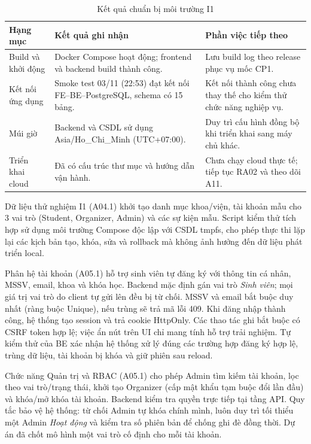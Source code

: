 \begin{table}[H]
\centering\small
\caption{Kết quả chuẩn bị môi trường I1}\label{tab:i1-env}
\begin{tabularx}{\linewidth}{@{}p{.23\linewidth}XX@{}}
\toprule
\textbf{Hạng mục} & \textbf{Kết quả ghi nhận} & \textbf{Phần việc tiếp theo}\\\midrule
Build và khởi động & Docker Compose hoạt động; frontend và backend build thành công. & Lưu build log theo release phục vụ mốc CP1.\\
Kết nối ứng dụng & Smoke test 03/11 (22:53) đạt kết nối FE--BE--PostgreSQL, schema có 15 bảng. & Kết nối thành công chưa thay thế cho kiểm thử chức năng nghiệp vụ.\\
Múi giờ & Backend và CSDL sử dụng Asia/Ho\_Chi\_Minh (UTC+07:00). & Duy trì cấu hình đồng bộ khi triển khai sang máy chủ khác.\\
Triển khai cloud & Đã có cấu trúc thư mục và hướng dẫn vận hành. & Chưa chạy cloud thực tế; tiếp tục RA02 và theo dõi A11.\\
\bottomrule
\end{tabularx}
\end{table}

Dữ liệu thử nghiệm I1 (A04.1) khởi tạo danh mục khoa/viện, tài khoản mẫu cho 3 vai trò (Student, Organizer, Admin) và các sự kiện mẫu. Script kiểm thử tích hợp sử dụng môi trường Compose độc lập với CSDL tmpfs, cho phép thực thi lặp lại các kịch bản tạo, khóa, sửa và rollback mà không ảnh hưởng đến dữ liệu phát triển local.


Phân hệ tài khoản (A05.1) hỗ trợ sinh viên tự đăng ký với thông tin cá nhân, MSSV, email, khoa và khóa học. Backend mặc định gán vai trò \textit{Sinh viên}; mọi giá trị vai trò do client tự gửi lên đều bị từ chối. MSSV và email bắt buộc duy nhất (ràng buộc Unique), nếu trùng sẽ trả mã lỗi 409. Khi đăng nhập thành công, hệ thống tạo session và trả cookie HttpOnly. Các thao tác ghi bắt buộc có CSRF token hợp lệ; việc ẩn nút trên UI chỉ mang tính hỗ trợ trải nghiệm. Tự kiểm thử của BE xác nhận hệ thống xử lý đúng các trường hợp đăng ký hợp lệ, trùng dữ liệu, tài khoản bị khóa và giữ phiên sau reload.

Chức năng Quản trị và RBAC (A05.1) cho phép Admin tìm kiếm tài khoản, lọc theo vai trò/trạng thái, khởi tạo Organizer (cấp mật khẩu tạm buộc đổi lần đầu) và khóa/mở khóa tài khoản. Backend kiểm tra quyền trực tiếp tại tầng API. Quy tắc bảo vệ hệ thống: từ chối Admin tự khóa chính mình, luôn duy trì tối thiểu một Admin \textit{Hoạt động} và kiểm tra số phiên bản để chống ghi đè đồng thời. Dự án đã chốt mô hình một vai trò cố định cho mỗi tài khoản.

